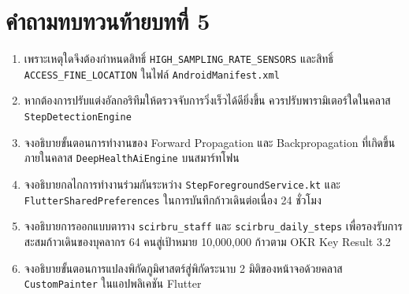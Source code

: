 \section*{คำถามทบทวนท้ายบทที่ 5}
\begin{enumerate}
    \item เพราะเหตุใดจึงต้องกำหนดสิทธิ์ \texttt{HIGH\_SAMPLING\_RATE\_SENSORS} และสิทธิ์ \texttt{ACCESS\_FINE\_LOCATION} ในไฟล์ \texttt{AndroidManifest.xml}
    \item หากต้องการปรับแต่งอัลกอริทึมให้ตรวจจับการวิ่งเร็วได้ดียิ่งขึ้น ควรปรับพารามิเตอร์ใดในคลาส \texttt{StepDetectionEngine}
    \item จงอธิบายขั้นตอนการทำงานของ Forward Propagation และ Backpropagation ที่เกิดขึ้นภายในคลาส \texttt{DeepHealthAiEngine} บนสมาร์ทโฟน
    \item จงอธิบายกลไกการทำงานร่วมกันระหว่าง \texttt{StepForegroundService.kt} และ \texttt{FlutterSharedPreferences} ในการบันทึกก้าวเดินต่อเนื่อง 24 ชั่วโมง
    \item จงอธิบายการออกแบบตาราง \texttt{scirbru\_staff} และ \texttt{scirbru\_daily\_steps} เพื่อรองรับการสะสมก้าวเดินของบุคลากร 64 คนสู่เป้าหมาย 10,000,000 ก้าวตาม OKR Key Result 3.2
    \item จงอธิบายขั้นตอนการแปลงพิกัดภูมิศาสตร์สู่พิกัดระนาบ 2 มิติของหน้าจอด้วยคลาส \texttt{CustomPainter} ในแอปพลิเคชัน Flutter
\end{enumerate}
\clearpage

